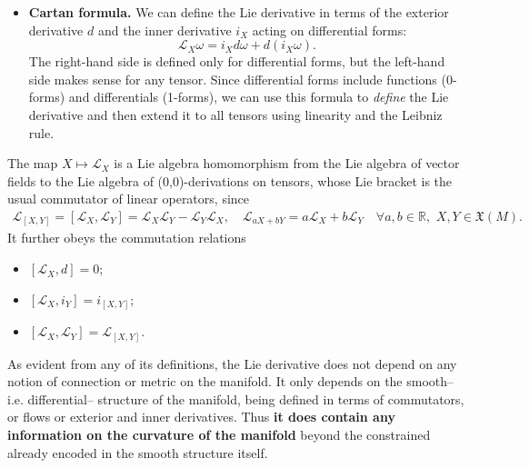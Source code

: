 \documentclass[../geometry_main.tex]{subfiles}
\begin{document}
\begin{mytheorem}
\begin{itemize}
    \item []\textbf{Cartan formula.} We can define the Lie derivative in terms of the exterior derivative $d$ and the inner derivative $i_X$ acting on differential forms:
    \begin{equation}
        \mathcal{L}_X \omega = i_X d \omega + d (i_X \omega).
    \end{equation}
    The right-hand side is defined only for differential forms, but the left-hand side makes sense for any tensor.
    Since differential forms include functions (0-forms) and differentials (1-forms), we can use this formula to \emph{define} the Lie derivative and then extend it to all tensors using linearity and the Leibniz rule.
\end{itemize}
%
The map $X\mapsto \mathcal{L}_X$ is a Lie algebra homomorphism from the Lie algebra of vector fields to the Lie algebra of (0,0)-derivations on tensors, whose Lie bracket is the usual commutator of linear operators, since
\begin{align}
    \mathcal{L}_{[X,Y]} = [\mathcal{L}_X, \mathcal{L}_Y] = \mathcal{L}_X\mathcal{L}_Y - \mathcal{L}_Y\mathcal{L}_X, 
    \quad \mathcal{L}_{aX + bY} = a \mathcal{L}_X + b \mathcal{L}_Y \quad \forall a,b\in \mathbb{R}, \,\, X,Y \in \mathfrak{X}(M).
\end{align}
It further obeys the commutation relations
\begin{itemize}
    \item $[\mathcal{L}_X, d] = 0$;
    \item $[\mathcal{L}_X, i_Y] = i_{[X,Y]}$;
    \item $[\mathcal{L}_X, \mathcal{L}_Y] = \mathcal{L}_{[X,Y]}$.
\end{itemize}
\end{mytheorem}


\begin{mytheorem}
As evident from any of its definitions, the Lie derivative does not depend on any notion of connection or metric on the manifold.
It only depends on the smooth-- i.e. differential-- structure of the manifold, being defined in terms of commutators, or flows or exterior and inner derivatives.
Thus \textbf{it does contain any information on the curvature of the manifold} beyond the constrained already encoded in the smooth structure itself.
\end{mytheorem}
\end{document}
